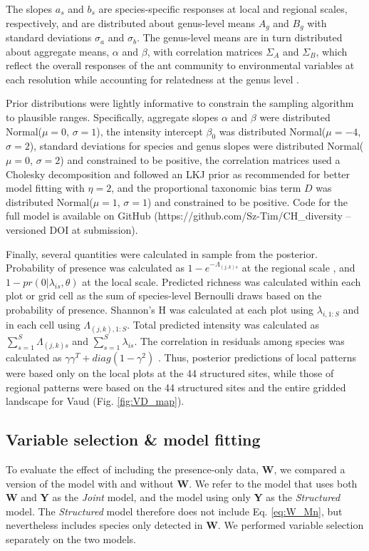 \documentclass[preprint,review,times,12pt]{elsarticle}
\begin{document}
The slopes $a_s$ and $b_s$ are species-specific responses at local and regional scales, respectively, and are distributed about genus-level means $A_g$ and $B_g$ with standard deviations $\sigma_a$ and $\sigma_b$. The genus-level means are in turn distributed about aggregate means, $\alpha$ and $\beta$, with correlation matrices $\Sigma_A$ and $\Sigma_B$, which reflect the overall responses of the ant community to environmental variables at each resolution while accounting for relatedness at the genus level \citep{Hadfield2010b,Ovaskainen2011,Szewczyk2018,Caradima2019}.

Prior distributions were lightly informative to constrain the sampling algorithm to plausible ranges. Specifically, aggregate slopes $\alpha$ and $\beta$ were distributed Normal($\mu=0$, $\sigma=1$), the intensity intercept $\beta_0$ was distributed Normal($\mu=-4$, $\sigma=2$), standard deviations for species and genus slopes were distributed Normal($\mu=0$, $\sigma=2$) and constrained to be positive, the correlation matrices used a Cholesky decomposition and followed an LKJ prior as recommended for better model fitting \citep{Carpenter2017,Caradima2019} with $\eta=2$, and the proportional taxonomic bias term $D$ was distributed Normal($\mu=1$, $\sigma=1$) and constrained to be positive. Code for the full model is available on GitHub (https://github.com/Sz-Tim/CH\_diversity -- versioned DOI at submission).

Finally, several quantities were calculated in sample from the posterior. Probability of presence was calculated as $1 - e^{-\Lambda_{(j,k)s}}$ at the regional scale \citep{Hefley2016}, and $1 - pr(0 | \lambda_{is}, \theta)$ at the local scale. Predicted richness was calculated within each plot or grid cell as the sum of species-level Bernoulli draws based on the probability of presence. Shannon's H was calculated at each plot using $\lambda_{i,1:S}$ and in each cell using $\Lambda_{(j,k),1:S}$. Total predicted intensity was calculated as $\sum_{s=1}^{S}\Lambda_{(j,k)s}$ and $\sum_{s=1}^{S}\lambda_{is}$. The correlation in residuals among species was calculated as $\gamma \gamma^T + diag(1 - \gamma^2)$ \citep{Tobler2019}. Thus, posterior predictions of local patterns were based only on the local plots at the 44 structured sites, while those of regional patterns were based on the 44 structured sites and the entire gridded landscape for Vaud (Fig. \ref{fig:VD_map}). 


\subsection{Variable selection \& model fitting}
To evaluate the effect of including the presence-only data, \textbf{W}, we compared a version of the model with and without \textbf{W}. We refer to the model that uses both \textbf{W} and \textbf{Y} as the \emph{Joint} model, and the model using only \textbf{Y} as the \emph{Structured} model. The \emph{Structured} model therefore does not include Eq. \ref{eq:W_Mn}, but nevertheless includes species only detected in \textbf{W}. We performed variable selection separately on the two models.
\end{document}
